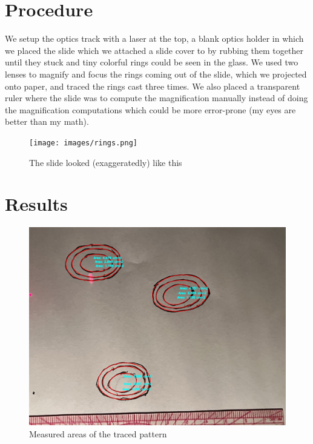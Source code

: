 \documentclass[12pt,letterpaper]{article}
\begin{document}
\section{Procedure}

We setup the optics track with a laser at the top, a blank optics holder in which we placed the slide which we attached a slide cover to by rubbing them together until they stuck and tiny colorful rings could be seen in the glass. We used two lenses to magnify and focus the rings coming out of the slide, which we projected onto paper, and traced the rings cast three times. We also placed a transparent ruler where the slide was to compute the magnification manually instead of doing the magnification computations which could be more error-prone (my eyes are better than my math).

\begin{figure}[ht]
    \centering
    \texttt{[image: images/rings.png]}
    \caption{The slide looked (exaggeratedly) like this}
    \label{fig:setup}
\end{figure}

\section{Results}

\begin{figure}[ht]
    \centering
    \includegraphics[width=6in]{images/areas.jpg}
    \caption{Measured areas of the traced pattern}
    \label{fig:setup}
\end{figure}
\end{document}

